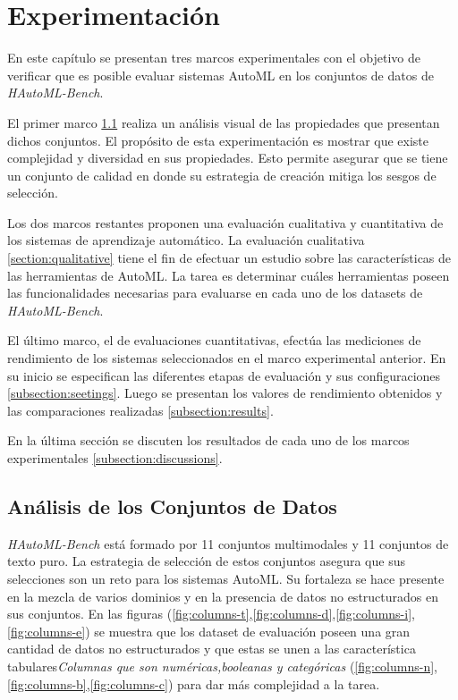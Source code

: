 \chapter{Experimentación}\label{chapter:experiments}

En este capítulo se presentan tres marcos experimentales con el objetivo de verificar que es posible evaluar sistemas AutoML en los conjuntos de datos de 
\textit{HAutoML-Bench}. 

El primer marco \ref{section:data} realiza un análisis visual de las propiedades que presentan dichos conjuntos. El propósito de esta experimentación es mostrar que 
existe complejidad y diversidad en sus propiedades. Esto permite asegurar que se tiene un conjunto de calidad en donde su estrategia de creación mitiga los sesgos de 
selección.

Los dos marcos restantes proponen una evaluación cualitativa y cuantitativa de los sistemas de aprendizaje automático.
La evaluación cualitativa \ref{section:qualitative} tiene el fin de efectuar un estudio sobre las características de las herramientas de AutoML. La tarea es determinar 
cuáles herramientas poseen las funcionalidades necesarias para evaluarse en cada uno de los datasets de \textit{HAutoML-Bench}.

El último marco, el de evaluaciones cuantitativas, efectúa las mediciones de rendimiento de los sistemas seleccionados en el marco experimental anterior. En su inicio 
se especifican las diferentes etapas de evaluación y sus configuraciones \ref{subsection:seetings}. Luego se presentan los valores de 
rendimiento obtenidos y las comparaciones realizadas \ref{subsection:results}.

En la última sección se discuten los resultados de cada uno de los marcos experimentales \ref{subsection:discussions}.  

\section{Análisis de los Conjuntos de Datos}\label{section:data}

\textit{HAutoML-Bench} está formado por 11 conjuntos multimodales y 11 conjuntos de texto puro.
La estrategia de selección de estos conjuntos asegura que sus selecciones son un reto para los sistemas AutoML.
Su fortaleza se hace presente en la mezcla de varios dominios y en la presencia de datos no estructurados en sus conjuntos. 
En las figuras (\ref{fig:columns-t},\ref{fig:columns-d},\ref{fig:columns-i},\ref{fig:columns-e}) se muestra que los dataset de evaluación poseen una gran cantidad de 
datos no estructurados y que estas se unen a las característica 
tabulares\textit{Columnas que son numéricas,booleanas y categóricas} (\ref{fig:columns-n},\ref{fig:columns-b},\ref{fig:columns-c}) para dar más complejidad a la tarea.

